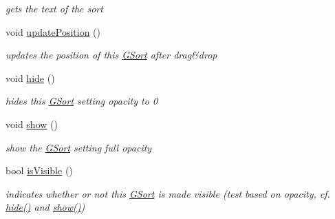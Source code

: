 \begin{DoxyCompactItemize}
\begin{DoxyCompactList}\small\item\em gets the text of the sort \end{DoxyCompactList}\item 
\hypertarget{class_g_sort_a75e1763370c73d2afbe3727f2742bfa4}{void \hyperlink{class_g_sort_a75e1763370c73d2afbe3727f2742bfa4}{update\-Position} ()}\label{class_g_sort_a75e1763370c73d2afbe3727f2742bfa4}

\begin{DoxyCompactList}\small\item\em updates the position of this \hyperlink{class_g_sort}{\-G\-Sort} after drag\&drop \end{DoxyCompactList}\item 
\hypertarget{class_g_sort_acafeaec8637b62aea47c2ecb4c36e0be}{void \hyperlink{class_g_sort_acafeaec8637b62aea47c2ecb4c36e0be}{hide} ()}\label{class_g_sort_acafeaec8637b62aea47c2ecb4c36e0be}

\begin{DoxyCompactList}\small\item\em hides this \hyperlink{class_g_sort}{\-G\-Sort} setting opacity to 0 \end{DoxyCompactList}\item 
\hypertarget{class_g_sort_a6cb13a9b6ef35dc7698b165ff0d34b88}{void \hyperlink{class_g_sort_a6cb13a9b6ef35dc7698b165ff0d34b88}{show} ()}\label{class_g_sort_a6cb13a9b6ef35dc7698b165ff0d34b88}

\begin{DoxyCompactList}\small\item\em show the \hyperlink{class_g_sort}{\-G\-Sort} setting full opacity \end{DoxyCompactList}\item 
\hypertarget{class_g_sort_a58e2a6099a59b26ffe7dafd90590bd3d}{bool \hyperlink{class_g_sort_a58e2a6099a59b26ffe7dafd90590bd3d}{is\-Visible} ()}\label{class_g_sort_a58e2a6099a59b26ffe7dafd90590bd3d}

\begin{DoxyCompactList}\small\item\em indicates whether or not this \hyperlink{class_g_sort}{\-G\-Sort} is made visible (test based on opacity, cf. \hyperlink{class_g_sort_acafeaec8637b62aea47c2ecb4c36e0be}{hide()} and \hyperlink{class_g_sort_a6cb13a9b6ef35dc7698b165ff0d34b88}{show()}) \end{DoxyCompactList}\end{DoxyCompactItemize}
